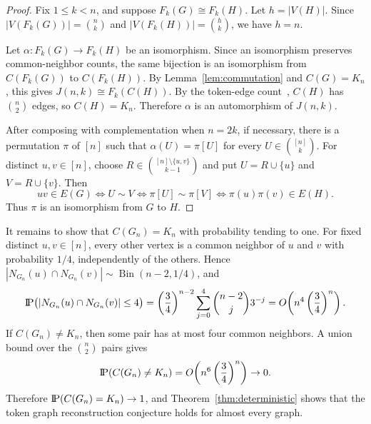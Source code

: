 \documentclass[11pt]{amsart}
\newcommand{\probP}{\text{I\kern-0.15em P}}
\begin{document}
\begin{proof}
Fix $1\leq k<n$, and suppose $F_k(G)\cong F_k(H)$. Let $h=|V(H)|$. Since $|V(F_k(G))|=\binom nk$ and $|V(F_k(H))|=\binom hk$, we have $h=n$.

Let $\alpha:F_k(G)\to F_k(H)$ be an isomorphism. Since an isomorphism preserves common-neighbor counts, the same bijection is an isomorphism from $C(F_k(G))$ to $C(F_k(H))$. By Lemma~\ref{lem:commutation} and $C(G)=K_n$, this gives $J(n,k)\cong F_k(C(H))$. By the token-edge count~\cite{FabilaMonroyEtAl2012}, $C(H)$ has $\binom n2$ edges, so $C(H)=K_n$. Therefore $\alpha$ is an automorphism of $J(n,k)$.

After composing with complementation when $n=2k$, if necessary, there is a permutation $\pi$ of $[n]$ such that $\alpha(U)=\pi[U]$ for every $U\in\binom{[n]}k$. For distinct $u,v\in[n]$, choose $R\in\binom{[n]\setminus\{u,v\}}{k-1}$ and put $U=R\cup\{u\}$ and $V=R\cup\{v\}$. Then
$$
uv\in E(G)\iff U\sim V\iff \pi[U]\sim\pi[V]\iff \pi(u)\pi(v)\in E(H).
$$
Thus $\pi$ is an isomorphism from $G$ to $H$.
\end{proof}

It remains to show that $C(G_n)=K_n$ with probability tending to one. For fixed distinct $u,v\in[n]$, every other vertex is a common neighbor of $u$ and $v$ with probability $1/4$, independently of the others. Hence $|N_{G_n}(u)\cap N_{G_n}(v)|\sim\operatorname{Bin}(n-2,1/4)$, and
\[
\probP\bigl(|N_{G_n}(u)\cap N_{G_n}(v)|\leq 4\bigr)
=\left(\frac34\right)^{n-2}\sum_{j=0}^4\binom{n-2}{j}3^{-j}
=O\!\left(n^4\left(\frac34\right)^n\right).
\]
If $C(G_n)\neq K_n$, then some pair has at most four common neighbors. A union bound over the $\binom n2$ pairs gives
\[
\probP(C(G_n)\neq K_n)=O\!\left(n^6\left(\frac34\right)^n\right)\to 0.
\]
Therefore $\probP(C(G_n)=K_n)\to 1$, and Theorem~\ref{thm:deterministic} shows that the token graph reconstruction conjecture holds for almost every graph.
\end{document}
